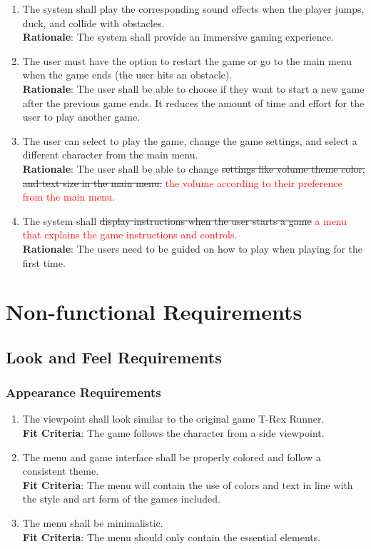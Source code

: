 \documentclass[12pt, titlepage]{article}
\begin{document}
\begin{enumerate}
	\item The system shall play the corresponding sound effects when the player jumps, duck, and collide with obstacles.\\
	\textbf{Rationale}: The system shall provide an immersive gaming experience.
	\item The user must have the option to restart the game or go to the main menu when the game ends (the user hits an obstacle).\\
	\textbf{Rationale}: The user shall be able to choose if they want to start a new game after the previous game ends. It reduces the amount of time and effort for the user to play another game.
	\item The user can select to play the game, change the game settings, and select a different character from the main menu.\\
	\textbf{Rationale}: The user shall be able to change \sout{settings like volume theme color, and text size in the main menu. } \textcolor{red}{the volume according to their preference from the main menu.} 
	\item The system shall \sout{display instructions when the user starts a game} \textcolor{red}{ a menu that explains the game instructions and controls.}\\
	\textbf{Rationale}: The users need to be guided on how to play when playing for the first time.
\end{enumerate}

\section{Non-functional Requirements}
\subsection{Look and Feel Requirements}
\subsubsection{Appearance Requirements}
\begin{enumerate}[leftmargin=1.20cm, label={LF \arabic*}]
    \item The viewpoint shall look similar to the original game T-Rex Runner.\\
    \textbf{Fit Criteria}: The game follows the character from a side viewpoint.
    \item The menu and game interface shall be properly colored and follow a consistent theme.\\
    \textbf{Fit Criteria}: The menu will contain the use of colors and text in line with the style and art form of the games included.
    \item The menu shall be minimalistic.\\
    \textbf{Fit Criteria}: The menu should only contain the essential elements.
\end{enumerate}
\end{document}

